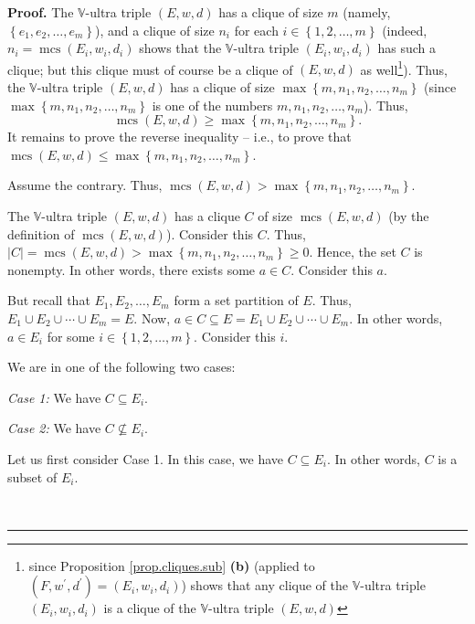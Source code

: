 \documentclass[numbers=enddot,12pt,final,onecolumn,notitlepage]{scrartcl}%
\theoremstyle{definition}
\newenvironment{proof}[1][Proof]{\noindent\textbf{#1.} }{\ \rule{0.5em}{0.5em}}
\renewcommand{\leq}{\leqslant}
\renewcommand{\geq}{\geqslant}
\theoremstyle{plainsl}
\begin{document}
\begin{proof}
The $\mathbb{V}$-ultra triple $\left(  E,w,d\right)  $ has a clique of size
$m$ (namely, $\left\{  e_{1},e_{2},\ldots,e_{m}\right\}  $), and a clique of
size $n_{i}$ for each $i\in\left\{  1,2,\ldots,m\right\}  $ (indeed,
$n_{i}=\operatorname*{mcs}\left(  E_{i},w_{i},d_{i}\right)  $ shows that the
$\mathbb{V}$-ultra triple $\left(  E_{i},w_{i},d_{i}\right)  $ has such a
clique; but this clique must of course be a clique of $\left(  E,w,d\right)  $
as well\footnote{since Proposition \ref{prop.cliques.sub} \textbf{(b)}
(applied to $\left(  F,w^{\prime},d^{\prime}\right)  =\left(  E_{i}%
,w_{i},d_{i}\right)  $) shows that any clique of the $\mathbb{V}$-ultra triple
$\left(  E_{i},w_{i},d_{i}\right)  $ is a clique of the $\mathbb{V}$-ultra
triple $\left(  E,w,d\right)  $}). Thus, the $\mathbb{V}$-ultra triple
$\left(  E,w,d\right)  $ has a clique of size $\max\left\{  m,n_{1}%
,n_{2},\ldots,n_{m}\right\}  $ (since $\max\left\{  m,n_{1},n_{2},\ldots
,n_{m}\right\}  $ is one of the numbers $m,n_{1},n_{2},\ldots,n_{m}$). Thus,%
\[
\operatorname*{mcs}\left(  E,w,d\right)  \geq\max\left\{  m,n_{1},n_{2}%
,\ldots,n_{m}\right\}  .
\]
It remains to prove the reverse inequality -- i.e., to prove that
$\operatorname*{mcs}\left(  E,w,d\right)  \leq\max\left\{  m,n_{1}%
,n_{2},\ldots,n_{m}\right\}  $.

Assume the contrary. Thus, $\operatorname*{mcs}\left(  E,w,d\right)
>\max\left\{  m,n_{1},n_{2},\ldots,n_{m}\right\}  $.

The $\mathbb{V}$-ultra triple $\left(  E,w,d\right)  $ has a clique $C$ of
size $\operatorname*{mcs}\left(  E,w,d\right)  $ (by the definition of
$\operatorname*{mcs}\left(  E,w,d\right)  $). Consider this $C$. Thus,
$\left\vert C\right\vert =\operatorname*{mcs}\left(  E,w,d\right)
>\max\left\{  m,n_{1},n_{2},\ldots,n_{m}\right\}  \geq0$. Hence, the set $C$
is nonempty. In other words, there exists some $a\in C$. Consider this $a$.

But recall that $E_{1},E_{2},\ldots,E_{m}$ form a set partition of $E$. Thus,
$E_{1}\cup E_{2}\cup\cdots\cup E_{m}=E$. Now, $a\in C\subseteq E=E_{1}\cup
E_{2}\cup\cdots\cup E_{m}$. In other words, $a\in E_{i}$ for some
$i\in\left\{  1,2,\ldots,m\right\}  $. Consider this $i$.

We are in one of the following two cases:

\textit{Case 1:} We have $C\subseteq E_{i}$.

\textit{Case 2:} We have $C\not \subseteq E_{i}$.

Let us first consider Case 1. In this case, we have $C\subseteq E_{i}$. In
other words, $C$ is a subset of $E_{i}$.


\end{proof}
\end{document}
